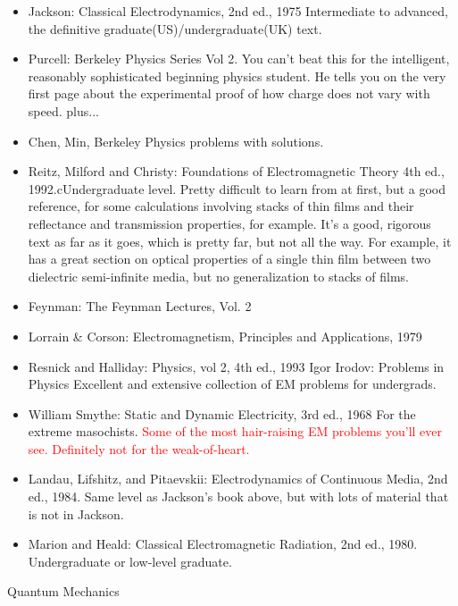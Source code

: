 \documentclass[10pt,a4paper]{book}
\theoremstyle{definition}
\begin{document}
\begin{itemize}
\item Jackson: Classical Electrodynamics, 2nd ed., 1975
Intermediate to advanced, the definitive graduate(US)/undergraduate(UK) text.

\item Purcell: Berkeley Physics Series Vol 2.
You can't beat this for the intelligent, reasonably sophisticated beginning physics student.  He tells you on the very first page about the experimental proof of how charge does not vary with speed.
plus... 
\item Chen, Min, Berkeley Physics problems with solutions.
\item Reitz, Milford and Christy: Foundations of Electromagnetic Theory 4th ed., 1992.cUndergraduate level. Pretty difficult to learn from at first, but a good reference, for some calculations involving stacks of thin films and their reflectance and transmission properties, for example.  It's a good, rigorous text as far as it goes, which is pretty far, but not all the way.  For example, it has a great section on optical properties of a single thin film between two dielectric semi-infinite media, but no generalization to stacks of films.

\item Feynman: The Feynman Lectures, Vol. 2
\item Lorrain \& Corson: Electromagnetism, Principles and Applications, 1979
\item Resnick and Halliday: Physics, vol 2, 4th ed., 1993
Igor Irodov: Problems in Physics Excellent and extensive collection of EM problems for undergrads.
\item William Smythe: Static and Dynamic Electricity, 3rd ed., 1968
For the extreme masochists.  \textcolor{red}{Some of the most hair-raising EM problems you'll ever see.  Definitely not for the weak-of-heart.}
\item Landau, Lifshitz, and Pitaevskii: Electrodynamics of Continuous Media, 2nd ed., 1984. Same level as Jackson's book above, but with lots of material that is not in Jackson.
\item Marion and Heald: Classical Electromagnetic Radiation, 2nd ed., 1980. Undergraduate or low-level graduate.
\end{itemize}


Quantum Mechanics
\end{document}
